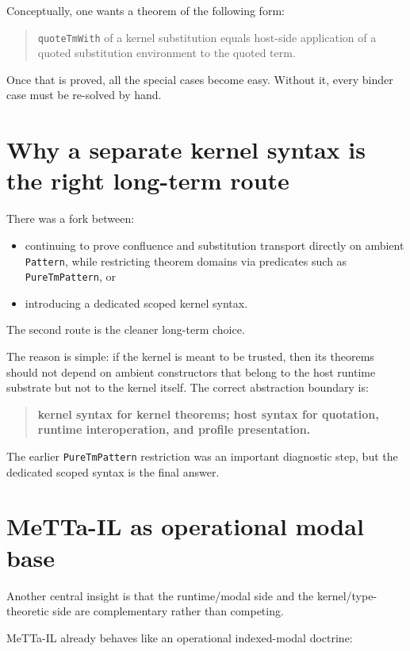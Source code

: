 \documentclass[11pt]{article}
\begin{document}
Conceptually, one wants a theorem of the following form:

\begin{quote}
\texttt{quoteTmWith} of a kernel substitution equals host-side application of a quoted substitution environment to the quoted term.
\end{quote}

Once that is proved, all the special cases become easy. Without it, every binder case must be re-solved by hand.

\section{Why a separate kernel syntax is the right long-term route}

There was a fork between:

\begin{itemize}
  \item continuing to prove confluence and substitution transport directly on ambient \texttt{Pattern}, while restricting theorem domains via predicates such as \texttt{PureTmPattern}, or
  \item introducing a dedicated scoped kernel syntax.
\end{itemize}

The second route is the cleaner long-term choice.

The reason is simple: if the kernel is meant to be trusted, then its theorems should not depend on ambient constructors that belong to the host runtime substrate but not to the kernel itself. The correct abstraction boundary is:

\begin{quote}
\textbf{kernel syntax for kernel theorems; host syntax for quotation, runtime interoperation, and profile presentation.}
\end{quote}

The earlier \texttt{PureTmPattern} restriction was an important diagnostic step, but the dedicated scoped syntax is the final answer.

\section{MeTTa-IL as operational modal base}

Another central insight is that the runtime/modal side and the kernel/type-theoretic side are complementary rather than competing.

MeTTa-IL already behaves like an operational indexed-modal doctrine:
\end{document}
